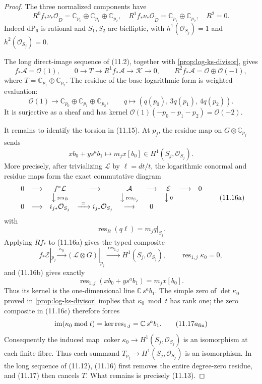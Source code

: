 \begin{proof}
The three normalized components have
\[
 R^0f_*\nu_*\mathcal O_{\widetilde D}
  =\mathbb C_{p_0}\oplus\mathbb C_{p_1}\oplus\mathbb C_{p_2},
 \quad
 R^1f_*\nu_*\mathcal O_{\widetilde D}
  =\mathbb C_{p_1}\oplus\mathbb C_{p_2},
 \quad R^2=0.
\tag{11.14}
\]
Indeed $\mathrm{dP}_6$ is rational and $S_1,S_2$ are bielliptic, with
$h^1(\mathcal O_{S_j})=1$ and $h^2(\mathcal O_{S_j})=0$.

The long direct-image sequence of (11.2), together with
\cref{prop:log-ks-divisor}, gives
\[
 f_*\mathcal A=\mathcal O(1),\qquad
 0\longrightarrow T\longrightarrow R^1f_*\mathcal A
 \longrightarrow\mathcal K\longrightarrow0,
 \qquad R^2f_*\mathcal A=\mathcal O\oplus\mathcal O(-1),
\tag{11.15}
\]
where $T=\mathbb C_{p_1}\oplus\mathbb C_{p_2}$.
The residue of the base logarithmic form is weighted evaluation:
\[
 \mathcal O(1)\longrightarrow
 \mathbb C_{p_0}\oplus\mathbb C_{p_1}\oplus\mathbb C_{p_2},
 \qquad q\longmapsto(q(p_0),\,3q(p_1),\,4q(p_2)).
\tag{11.16}
\]
It is surjective as a sheaf and has kernel
$\mathcal O(1)(-p_0-p_1-p_2)=\mathcal O(-2)$.

It remains to identify the torsion in (11.15).  At $p_j$, the residue map on
$G\otimes\mathbb C_{p_j}$ sends
\[
 x b_0+y s^ab_1\longmapsto m_jx[b_0]
 \in H^1(S_j,\mathcal O_{S_j}).
\tag{11.17}
\]
More precisely, after trivializing $\mathcal L$ by
$\ell=dt/t$, the logarithmic conormal and residue maps form the exact
commutative diagram
\[
\begin{array}{ccccccccc}
0&\longrightarrow&f^*\mathcal L&\longrightarrow&\mathcal A
 &\longrightarrow&\mathcal E&\longrightarrow&0\\
&&\big\downarrow\,{\scriptstyle\operatorname{res}_B}
&&\big\downarrow\,{\scriptstyle\operatorname{res}_{S_j}}
&&\big\downarrow\,{\scriptstyle 0}&&\\
0&\longrightarrow&i_{j*}\mathcal O_{S_j}&\xrightarrow{\ =\ }
 i_{j*}\mathcal O_{S_j}&\longrightarrow&0&&
\end{array}
\tag{11.16a}
\]
with
\[
 \operatorname{res}_B(q\ell)=m_jq|_{S_j}.
\tag{11.16b}
\]
Applying $Rf_*$ to (11.16a) gives the typed composite
\[
 f_*\mathcal E|_{p_j}\xrightarrow{\ \kappa_0\ }
 (\mathcal L\otimes G)|_{p_j}
 \xrightarrow{\ \operatorname{res}_{1,j}\ }
 H^1(S_j,\mathcal O_{S_j}),
 \qquad \operatorname{res}_{1,j}\kappa_0=0,
\tag{11.16c}
\]
and (11.16b) gives exactly
\[
 \operatorname{res}_{1,j}(xb_0+ys^ab_1)=m_jx[b_0].
\]
Thus its kernel is the one-dimensional line
$\mathbb C\,s^ab_1$.  The simple zero of $\det\kappa_0$ proved in
\cref{prop:log-ks-divisor} implies that $\kappa_0\bmod t$ has rank one;
the zero composite in (11.16c) therefore forces
\[
 \operatorname{im}(\kappa_0\bmod t)
 =\ker\operatorname{res}_{1,j}
 =\mathbb C\,s^ab_1.
\tag{$11.17a_{\mathrm{fin}}$}
\]
Consequently the induced map
$\operatorname{coker}\kappa_0\to H^1(S_j,\mathcal O_{S_j})$ is an
isomorphism at each finite fibre.  Thus each summand
$T_{p_j}\to H^1(S_j,\mathcal O_{S_j})$ is an isomorphism.  In the long
sequence of (11.12), (11.16) first removes the entire degree-zero residue,
and (11.17) then cancels $T$.  What remains is precisely (11.13).
\end{proof}

